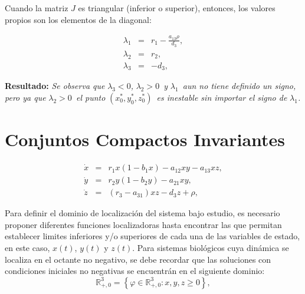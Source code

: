 \documentclass[letterpaper,11pt]{article}
\begin{document}
Cuando la matriz $J$ es triangular (inferior o superior), entonces, los
valores propios son los elementos de la diagonal:

\begin{eqnarray*}
\lambda _{1} &=&r_{1}-\frac{a_{13}\rho }{d_{3}}, \\
\lambda _{2} &=&r_{2}, \\
\lambda _{3} &=&-d_{3},
\end{eqnarray*}

\textbf{Resultado: }\emph{Se observa que }$\lambda _{3}<0$\emph{, }$\lambda
_{2}>0$\emph{\ y }$\lambda _{1}$\emph{\ aun no tiene definido un signo, pero
ya que }$\lambda _{2}>0$\emph{\ el punto }$\left( x_{0}^{\ast },y_{0}^{\ast
},z_{0}^{\ast }\right) $\emph{\ es inestable sin importar el signo de }$%
\lambda _{1}$\emph{.}

\section{Conjuntos Compactos Invariantes}

\begin{eqnarray*}
\dot{x} &=&r_{1}x\left( 1-b_{1}x\right) -a_{12}xy-a_{13}xz, \\
\dot{y} &=&r_{2}y\left( 1-b_{2}y\right) -a_{21}xy, \\
\dot{z} &=&\left( r_{3}-a_{31}\right) xz-d_{3}z+\rho ,
\end{eqnarray*}

Para definir el dominio de localizaci\'{o}n del sistema bajo estudio, es
necesario proponer diferentes funciones localizadoras hasta encontrar las
que permitan establecer limites inferiores y/o superiores de cada una de las
variables de estado, en este caso, $x\left( t\right) $, $y\left( t\right) $
y $z\left( t\right) $. Para sistemas biol\'{o}gicos cuya din\'{a}mica se
localiza en el octante no negativo, se debe recordar que las soluciones con
condiciones iniciales no negativas se encuentr\'{a}n en el siguiente dominio:%
\begin{equation*}
\mathbb{R}
_{+,0}^{3}=\left\{ \varphi \in 
\mathbb{R}
_{+,0}^{3}:x,y,z\geq 0\right\} ,
\end{equation*}
\end{document}
